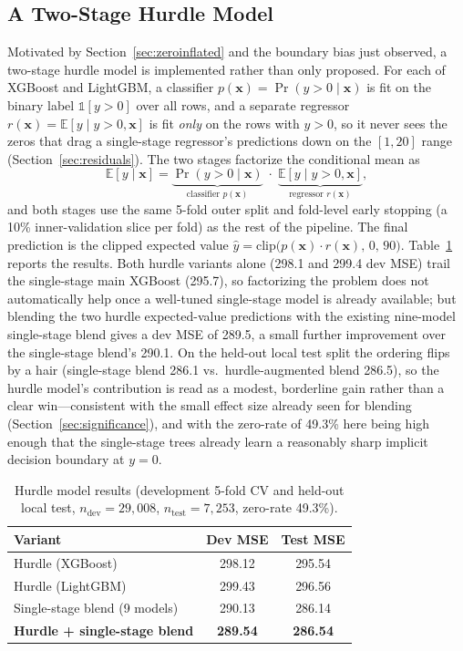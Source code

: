 \documentclass[journal]{IEEEtran}
\begin{document}
\subsection{A Two-Stage Hurdle Model}
\label{sec:hurdle-impl}
Motivated by Section~\ref{sec:zeroinflated} and the boundary bias just
observed, a two-stage hurdle model is implemented rather than only proposed.
For each of XGBoost and LightGBM, a classifier
$p(\mathbf{x})=\Pr(y>0\mid\mathbf{x})$ is fit on the binary label
$\mathbb{1}[y>0]$ over all rows, and a separate regressor
$r(\mathbf{x})=\mathbb{E}[y\mid y>0,\mathbf{x}]$ is fit \emph{only} on the rows
with $y>0$, so it never sees the zeros that drag a single-stage regressor's
predictions down on the $[1,20]$ range (Section~\ref{sec:residuals}). The two
stages factorize the conditional mean as
\begin{equation}
\mathbb{E}[y\mid\mathbf{x}] = \underbrace{\Pr(y>0\mid\mathbf{x})}_{\text{classifier }p(\mathbf{x})}\;\cdot\;\underbrace{\mathbb{E}[y\mid y>0,\mathbf{x}]}_{\text{regressor }r(\mathbf{x})},
\label{eq:hurdle}
\end{equation}
and both stages use the same 5-fold outer split and fold-level early stopping
(a 10\% inner-validation slice per fold) as the rest of the pipeline. The final
prediction is the clipped expected value
$\hat y=\mathrm{clip}\big(p(\mathbf{x})\cdot r(\mathbf{x}),\,0,\,90\big)$.
Table~\ref{tab:hurdle} reports the results. Both hurdle variants alone (298.1
and 299.4 dev MSE) trail the single-stage main XGBoost (295.7), so factorizing
the problem does not automatically help once a well-tuned single-stage model
is already available; but blending the two hurdle expected-value predictions
with the existing nine-model single-stage blend gives a dev MSE of 289.5, a
small further improvement over the single-stage blend's 290.1. On the
held-out local test split the ordering flips by a hair (single-stage blend
286.1 vs.\ hurdle-augmented blend 286.5), so the hurdle model's contribution
is read as a modest, borderline gain rather than a clear win---consistent with
the small effect size already seen for blending
(Section~\ref{sec:significance}), and with the zero-rate of 49.3\% here being
high enough that the single-stage trees already learn a reasonably sharp
implicit decision boundary at $y=0$.

\begin{table}[!t]
\caption{Hurdle model results (development 5-fold CV and held-out local test,
$n_{\text{dev}}=29{,}008$, $n_{\text{test}}=7{,}253$, zero-rate 49.3\%).}
\label{tab:hurdle}
\centering
\begin{tabular}{lcc}
\toprule
Variant & Dev MSE & Test MSE \\
\midrule
Hurdle (XGBoost) & 298.12 & 295.54 \\
Hurdle (LightGBM) & 299.43 & 296.56 \\
Single-stage blend (9 models) & 290.13 & 286.14 \\
\textbf{Hurdle + single-stage blend} & \textbf{289.54} & \textbf{286.54} \\
\bottomrule
\end{tabular}
\end{table}
\end{document}
